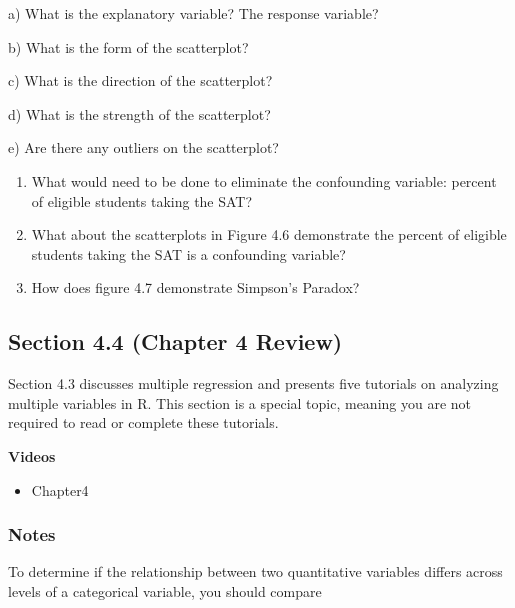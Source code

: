 \documentclass[
]{report}
\providecommand{\tightlist}{%
  \setlength{\itemsep}{0pt}\setlength{\parskip}{0pt}}
\newcommand{\rgs}{\vspace{12pt}} %
\newcommand{\rgi}{\hspace{24pt}}  %
\begin{document}
\rgi a) What is the explanatory variable? The response variable?\\
\rgs

\rgi b) What is the form of the scatterplot?
\rgs

\rgi c) What is the direction of the scatterplot?
\rgs

\rgi d) What is the strength of the scatterplot?
\rgs

\rgi e) Are there any outliers on the scatterplot?\\
\rgs

\begin{enumerate}
\def\labelenumi{\arabic{enumi}.}
\setcounter{enumi}{2}
\item
  What would need to be done to eliminate the confounding variable: percent of eligible students taking the SAT?
  \rgs
\item
  What about the scatterplots in Figure 4.6 demonstrate the percent of eligible students taking the SAT is a confounding variable?
  \rgs
\item
  How does figure 4.7 demonstrate Simpson's Paradox?
  \rgs
\end{enumerate}

\hypertarget{section-4.4-chapter-4-review}{%
\subsection*{Section 4.4 (Chapter 4 Review)}\label{section-4.4-chapter-4-review}}


Section 4.3 discusses multiple regression and presents five tutorials on analyzing multiple variables in R. This section is a special topic, meaning you are not required to read or complete these tutorials.

\textbf{Videos}

\begin{itemize}
\tightlist
\item
  Chapter4
\end{itemize}


\hypertarget{notes-14}{%
\subsubsection*{Notes}\label{notes-14}}

To determine if the relationship between two quantitative variables differs across levels of a categorical variable, you should compare
\end{document}
